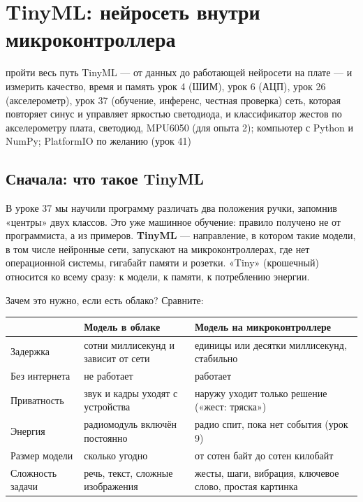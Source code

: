 \section{TinyML: нейросеть внутри микроконтроллера}\label{les:tinyml}
\lessonintro
  {пройти весь путь TinyML --- от данных до работающей нейросети на плате --- и измерить качество, время и память}
  {урок 4 (ШИМ), урок 6 (АЦП), урок 26 (акселерометр), урок 37 (обучение, инференс, честная проверка)}
  {сеть, которая повторяет синус и управляет яркостью светодиода, и классификатор жестов по акселерометру}
  {плата, светодиод, MPU6050 (для опыта 2); компьютер с Python и NumPy; PlatformIO по желанию (урок 41)}

\subsection{Сначала: что такое TinyML}

В уроке 37 мы научили программу различать два положения ручки, запомнив «центры» двух классов.
Это уже машинное обучение: правило получено не от программиста, а из примеров. \textbf{TinyML} ---
направление, в котором такие модели, в том числе нейронные сети, запускают на микроконтроллерах,
где нет операционной системы, гигабайт памяти и розетки. «Tiny» (крошечный) относится ко всему
сразу: к модели, к памяти, к потреблению энергии.

Зачем это нужно, если есть облако? Сравните:

\begin{center}\small
\begin{tabularx}{\textwidth}{@{}l X X@{}}
\toprule
 & Модель в облаке & Модель на микроконтроллере \\
\midrule
Задержка & сотни миллисекунд и зависит от сети & единицы или десятки миллисекунд, стабильно \\
Без интернета & не работает & работает \\
Приватность & звук и кадры уходят с устройства & наружу уходит только решение («жест: тряска») \\
Энергия & радиомодуль включён постоянно & радио спит, пока нет события (урок 9) \\
Размер модели & сколько угодно & от сотен байт до сотен килобайт \\
Сложность задачи & речь, текст, сложные изображения & жесты, шаги, вибрация, ключевое слово, простая картинка \\
\bottomrule
\end{tabularx}
\end{center}

